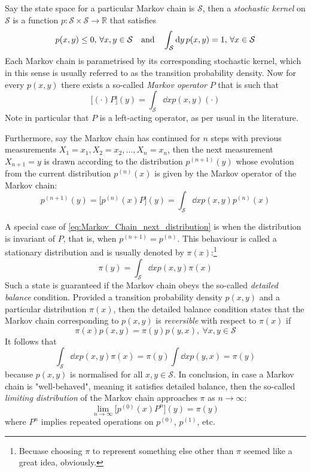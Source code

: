 \documentclass[nofootinbib,reprint,english]{revtex4-1}
\newcommand{\Sspace}{\mathcal{S}}
\begin{document}
Say the state space for a particular Markov chain is \(\mathcal{S}\), then a \emph{stochastic kernel} on \(\Sspace\) is a function \(p:\Sspace\times\Sspace\to\mathbb{R}\) that satisfies
\[p(x,y)\leq0,\,\forall x,y\in\Sspace\qand\int_\Sspace\dd{y}p(x,y)=1,\,\forall x\in\Sspace\]
Each Markov chain is parametrised by its corresponding stochastic kernel, which in this sense is usually referred to as the transition probability density. Now for every \(p(x,y)\) there exists a so-called \emph{Markov operator} \(P\) that is such that
\[\big[(\cdot)P\big](y)=\int_\Sspace\dd{x}p(x,y)(\cdot)\]
Note in particular that \(P\) is a left-acting operator, as per usual in the literature.

Furthermore, say the Markov chain has continued for \(n\) steps with previous measurements \(X_1=x_1,X_2=x_2,\ldots,X_n=x_n\), then the next measurement \(X_{n+1}=y\) is drawn according to the distribution \(p^{(n+1)}(y)\) whose evolution from the current distribution \(p^{(n)}(x)\) is given by the Markov operator of the Markov chain:
\begin{equation}\label{eq:Markov_Chain_next_distribution}
p^{(n+1)}(y)=\big[p^{(n)}(x)P\big](y)=\int_\Sspace\dd{x}p(x,y)p^{(n)}(x)
\end{equation}

A special case of \eqref{eq:Markov_Chain_next_distribution} is when the distribution is invariant of \(P\), that is, when \(p^{(n+1)}=p^{(n)}\). This behaviour is called a stationary distribution and is usually denoted by \(\pi(x)\):\footnote{Becuase choosing \(\pi\) to represent something else other than \(\pi\) seemed like a great idea, obviously.}
\begin{equation}
\pi(y)=\int_\Sspace\dd{x}p(x,y)\pi(x)
\end{equation}
Such a state is guaranteed if the Markov chain obeys the so-called \emph{detailed balance} condition. Provided a transition probability density \(p(x,y)\) and a particular distribution \(\pi(x)\), then the detailed balance condition states that the Markov chain corresponding to \(p(x,y)\) is \emph{reversible} with respect to \(\pi(x)\) if
\begin{equation}\label{eq:Markov_Chain_detailed_balance}
\pi(x)p(x,y)=\pi(y)p(y,x),\ \forall x,y\in\Sspace
\end{equation}
It follows that
\[\int_\Sspace\dd{x}p(x,y)\pi(x)=\pi(y)\int\dd{x}p(y,x)=\pi(y)\]
because \(p(x,y)\) is normalised for all \(x,y\in\Sspace\). In conclusion, in case a Markov chain is "well-behaved", meaning it satisfies detailed balance, then the so-called \emph{limiting distribution} of the Markov chain approaches \(\pi\) as \(n\to\infty\):
\begin{equation}
\lim_{n\to\infty}\big[p^{(0)}(x)P^n\big](y)=\pi(y)
\end{equation}
where \(P^n\) implies repeated operations on \(p^{(0)}\), \(p^{(1)}\), etc.
\end{document}
